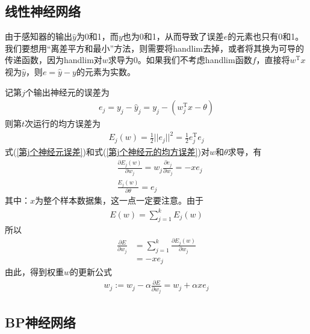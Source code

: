 {    \subsection{线性神经网络}
        \par
        由于感知器的输出$\hat{y}$为0和1，而$y$也为0和1，从而导致了误差$e$的元素也只有0和1。我们要想用“离差平方和最小”方法，则需要将handlim去掉，或者将其换为可导的传递函数，因为handlim对$w$求导为0。如果我们不考虑handlim函数$f$，直接将$w^\mathrm{T}x$视为$\hat{y}$，则$e = \hat{y} - y$的元素为实数。
        \par
        记第$j$个输出神经元的误差为
        \begin{align}
        \label{第j个神经元误差}
        e_j = y_j - \hat{y}_j = y_j - \left( w_j^\mathrm{T}x - \theta \right)
        \end{align}
        则第$t$次运行的均方误差为
        \begin{align}
        \label{第j个神经元的均方误差}
        E_j(w) = \frac{1}{2} ||e_j||^2 = \frac{1}{2}e_j^\mathrm{T}e_j
        \end{align}
        式(\ref{第j个神经元误差})和式(\ref{第j个神经元的均方误差})对$w$和$\theta$求导，有
        \begin{align*}
        & \frac{\partial E_j(w)}{\partial w_j} = w_j\frac{\partial e_j}{\partial w_j}= -x e_j\\
        & \frac{E_j(w)}{\partial \theta} = e_j
        \end{align*}
        其中：$x$为整个样本数据集，这一点一定要注意。由于
        \begin{align*}
        E(w) = \sum_{j=1}^k E_j(w)
        \end{align*}
        所以
        \begin{align*}
        \frac{\partial E}{\partial w_j} & = \sum_{j=1}^k \frac{\partial E_j(w)}{\partial w_j} \\
        & = -x e_j
        \end{align*}
        由此，得到权重$w$的更新公式
        \begin{align*}
        w_j:=w_j -\alpha \frac{\partial E}{\partial w_j} = w_j + \alpha x e_j
        \end{align*}

    \subsection{BP神经网络}
}
